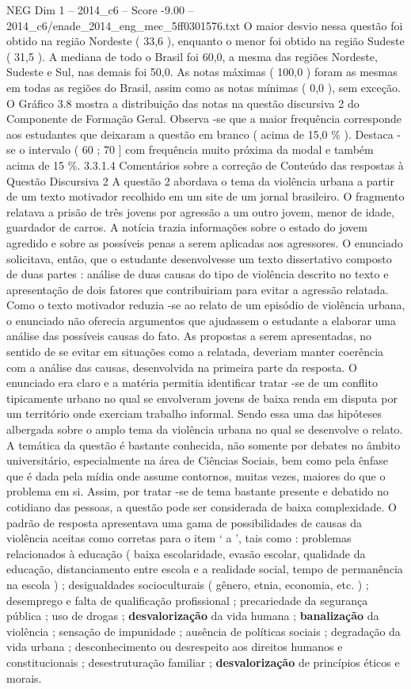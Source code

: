 \begin{textsample}{NEG Dim 1 – 2014\_c6 – Score -9.00 – 2014\_c6/enade\_2014\_eng\_mec\_5ff0301576.txt}
O maior desvio nessa questão foi obtido na região Nordeste ( 33,6 ), enquanto o menor foi obtido na região Sudeste ( 31,5 ).
A mediana de todo o Brasil foi 60,0, a mesma das regiões Nordeste, Sudeste e Sul, nas demais foi 50,0.
As notas máximas ( 100,0 ) foram as mesmas em todas as regiões do Brasil, assim como as notas mínimas ( 0,0 ), sem exceção.
O Gráfico 3.8 mostra a distribuição das notas na questão discursiva 2 do Componente de Formação Geral.
Observa -se que a maior frequência corresponde aos estudantes que deixaram a questão em branco ( acima de 15,0 \% ).
Destaca -se o intervalo ( 60 ; 70 ] com frequência muito próxima da modal e também acima de 15 \%. 3.3.1.4 Comentários sobre a correção de Conteúdo das respostas à Questão Discursiva 2 A questão 2 abordava o tema da violência urbana a partir de um texto motivador recolhido em um site de um jornal brasileiro.
O fragmento relatava a prisão de três jovens por agressão a um outro jovem, menor de idade, guardador de carros.
A notícia trazia informações sobre o estado do jovem agredido e sobre as possíveis penas a serem aplicadas aos agressores.
O enunciado solicitava, então, que o estudante desenvolvesse um texto dissertativo composto de duas partes : análise de duas causas do tipo de violência descrito no texto e apresentação de dois fatores que contribuiriam para evitar a agressão relatada.
Como o texto motivador reduzia -se ao relato de um episódio de violência urbana, o enunciado não oferecia argumentos que ajudassem o estudante a elaborar uma análise das possíveis causas do fato.
As propostas a serem apresentadas, no sentido de se evitar em situações como a relatada, deveriam manter coerência com a análise das causas, desenvolvida na primeira parte da resposta.
O enunciado era claro e a matéria permitia identificar tratar -se de um conflito tipicamente urbano no qual se envolveram jovens de baixa renda em disputa por um território onde exerciam trabalho informal.
Sendo essa uma das hipóteses albergada sobre o amplo tema da violência urbana no qual se desenvolve o relato.
A temática da questão é bastante conhecida, não somente por debates no âmbito universitário, especialmente na área de Ciências Sociais, bem como pela ênfase que é dada pela mídia onde assume contornos, muitas vezes, maiores do que o problema em si.
Assim, por tratar -se de tema bastante presente e debatido no cotidiano das pessoas, a questão pode ser considerada de baixa complexidade.
O padrão de resposta apresentava uma gama de possibilidades de causas da violência aceitas como corretas para o item ‘ a ’, tais como : problemas relacionados à educação ( baixa escolaridade, evasão escolar, qualidade da educação, distanciamento entre escola e a realidade social, tempo de permanência na escola ) ; desigualdades socioculturais ( gênero, etnia, economia, etc. ) ; desemprego e falta de qualificação profissional ; precariedade da segurança pública ; uso de drogas ; \textbf{desvalorização} da vida humana ; \textbf{banalização} da violência ; sensação de impunidade ; ausência de políticas sociais ; degradação da vida urbana ; desconhecimento ou desrespeito aos direitos humanos e constitucionais ; desestruturação familiar ; \textbf{desvalorização} de princípios éticos e morais.

\end{textsample}
